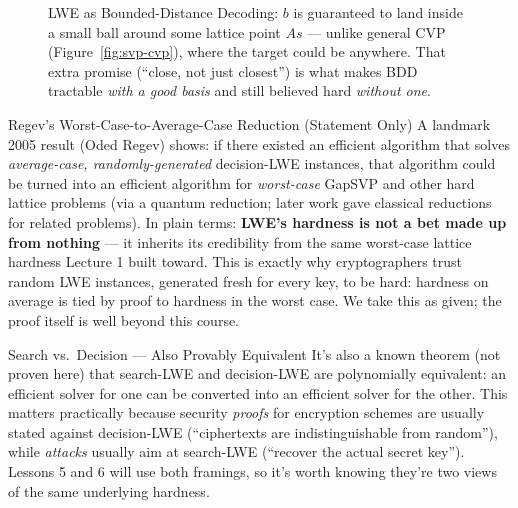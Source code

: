 \begin{figure}[ht]
\centering
{}
\caption{LWE as Bounded-Distance Decoding: $b$ is guaranteed to land inside a small ball around some lattice point $As$ --- unlike general CVP (Figure~\ref{fig:svp-cvp}), where the target could be anywhere. That extra promise (``close, not just closest'') is what makes BDD tractable \emph{with a good basis} and still believed hard \emph{without one}.}
\label{fig:bdd}
\end{figure}

\begin{factbox}{Regev's Worst-Case-to-Average-Case Reduction (Statement Only)}
A landmark 2005 result (Oded Regev) shows: if there existed an efficient algorithm that solves \emph{average-case, randomly-generated} decision-LWE instances, that algorithm could be turned into an efficient algorithm for \emph{worst-case} GapSVP and other hard lattice problems (via a quantum reduction; later work gave classical reductions for related problems). In plain terms: \textbf{LWE's hardness is not a bet made up from nothing} --- it inherits its credibility from the same worst-case lattice hardness Lecture 1 built toward. This is exactly why cryptographers trust random LWE instances, generated fresh for every key, to be hard: hardness on average is tied by proof to hardness in the worst case. We take this as given; the proof itself is well beyond this course.
\end{factbox}



\begin{previewbox}{Search vs.\ Decision --- Also Provably Equivalent}
It's also a known theorem (not proven here) that search-LWE and decision-LWE are polynomially equivalent: an efficient solver for one can be converted into an efficient solver for the other. This matters practically because security \emph{proofs} for encryption schemes are usually stated against decision-LWE (``ciphertexts are indistinguishable from random''), while \emph{attacks} usually aim at search-LWE (``recover the actual secret key''). Lessons 5 and 6 will use both framings, so it's worth knowing they're two views of the same underlying hardness.
\end{previewbox}


